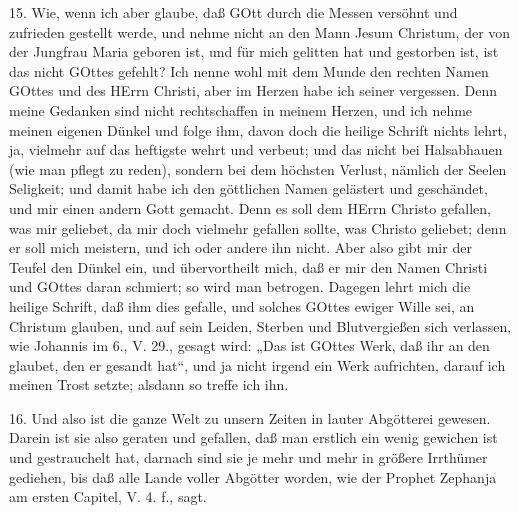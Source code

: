 15. Wie, wenn ich aber glaube, daß GOtt durch die Messen versöhnt und zufrieden gestellt werde, und nehme nicht an den Mann Jesum Christum, der von der Jungfrau Maria geboren ist, und für mich gelitten hat und gestorben ist, ist das nicht GOttes gefehlt? Ich nenne wohl mit dem Munde den rechten Namen GOttes und des HErrn Christi, aber im Herzen habe ich seiner vergessen. Denn meine Gedanken sind nicht rechtschaffen in meinem Herzen, und ich nehme meinen eigenen Dünkel und folge ihm, davon doch die heilige Schrift nichts lehrt, ja, vielmehr auf das heftigste wehrt und verbeut; und das nicht bei Halsabhauen (wie man pflegt zu reden), sondern bei dem höchsten Verlust, nämlich der Seelen Seligkeit; und damit habe ich den göttlichen Namen gelästert und geschändet, und mir einen andern Gott gemacht. Denn es soll dem HErrn Christo gefallen, was mir geliebet, da mir doch vielmehr gefallen sollte, was Christo geliebet; denn er soll mich meistern, und ich oder andere ihn nicht. Aber also gibt mir der Teufel den Dünkel ein, und übervortheilt mich, daß er mir den Namen Christi und GOttes daran schmiert; so wird man betrogen. Dagegen lehrt mich die heilige Schrift, daß ihm dies gefalle, und solches GOttes ewiger Wille sei, an Christum glauben, und auf sein Leiden, Sterben und Blutvergießen sich verlassen, wie Johannis im 6., V. 29., gesagt wird: „Das ist GOttes Werk, daß ihr an den glaubet, den er gesandt hat“, und ja nicht irgend ein Werk aufrichten, darauf ich meinen Trost setzte; alsdann so treffe ich ihn.

16. Und also ist die ganze Welt zu unsern Zeiten in lauter Abgötterei gewesen. Darein ist sie also geraten und gefallen, daß man erstlich ein wenig gewichen ist und gestrauchelt hat, darnach sind sie je mehr und mehr in größere Irrthümer gediehen, bis daß alle Lande voller Abgötter worden, wie der Prophet Zephanja am ersten Capitel, V. 4. f., sagt.

